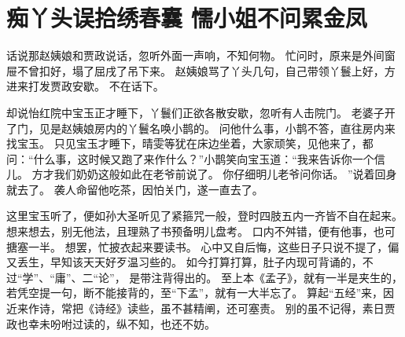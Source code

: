 \chapter{痴丫头误拾绣春囊 \quad 懦小姐不问累金凤}
\par
话说那赵姨娘和贾政说话，忽听外面一声响，不知何物。
忙问时，原来是外间窗屉不曾扣好，塌了屈戌了吊下来。
赵姨娘骂了丫头几句，自己带领丫鬟上好，方进来打发贾政安歇。
不在话下。
\par
却说怡红院中宝玉正才睡下，丫鬟们正欲各散安歇，忽听有人击院门。
老婆子开了门，见是赵姨娘房内的丫鬟名唤小鹊的。
问他什么事，小鹊不答，直往房内来找宝玉。
只见宝玉才睡下，晴雯等犹在床边坐着，大家顽笑，见他来了，都问：“什么事，这时候又跑了来作什么？”小鹊笑向宝玉道：“我来告诉你一个信儿。
方才我们奶奶这般如此在老爷前说了。
你仔细明儿老爷问你话。
”说着回身就去了。
袭人命留他吃茶，因怕关门，遂一直去了。
\par
这里宝玉听了，便如孙大圣听见了紧箍咒一般，登时四肢五内一齐皆不自在起来。
想来想去，别无他法，且理熟了书预备明儿盘考。
口内不舛错，便有他事，也可搪塞一半。
想罢，忙披衣起来要读书。
心中又自后悔，这些日子只说不提了，偏又丢生，早知该天天好歹温习些的。
如今打算打算，肚子内现可背诵的，不过“学”、“庸”、二“论”，
是带注背得出的。
至上本《孟子》，就有一半是夹生的，若凭空提一句，断不能接背的，至“下孟”，就有一大半忘了。
算起“五经”来，因近来作诗，常把《诗经》读些，虽不甚精阐，还可塞责。
别的虽不记得，素日贾政也幸未吩咐过读的，纵不知，也还不妨。
